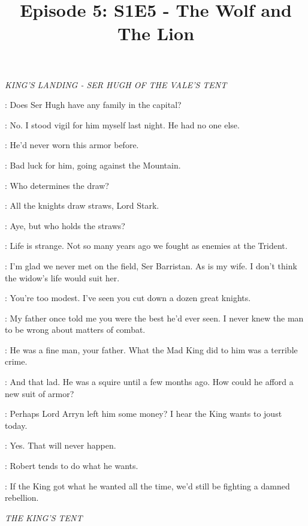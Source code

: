 

\title{Episode 5: S1E5 - The Wolf and The Lion}
\author{}
\date{}
\maketitle




\scene

\textit{KING'S LANDING - SER HUGH OF THE VALE'S TENT} 


\NED: Does Ser Hugh have any family in the capital? 

\SELMY: No. I stood vigil for him myself last night. He had no one else. 

\NED: He'd never worn this armor before. 

\SELMY: Bad luck for him, going against the Mountain. 

\NED: Who determines the draw? 

\SELMY: All the knights draw straws, Lord Stark. 

\NED: Aye, but who holds the straws?

\SELMY: Life is strange. Not so many years ago we fought as enemies at the Trident. 

\NED: I'm glad we never met on the field, Ser Barristan. As is my wife. I don't think the widow's life would suit her. 

\SELMY: You're too modest. I've seen you cut down a dozen great knights. 

\NED: My father once told me you were the best he'd ever seen. I never knew the man to be wrong about matters of combat. 

\SELMY: He was a fine man, your father. What the Mad King did to him was a terrible crime. 

\NED: And that lad. He was a squire until a few months ago. How could he afford a new suit of armor? 

\SELMY: Perhaps Lord Arryn left him some money? I hear the King wants to joust today. 

\NED: Yes. That will never happen. 

\SELMY: Robert tends to do what he wants. 

\NED: If the King got what he wanted all the time, we'd still be fighting a damned rebellion. 


\scene

\textit{THE KING'S TENT} 

